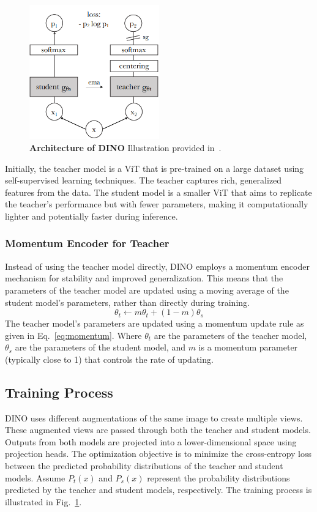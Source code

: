\begin{figure}
	\centering
	\includegraphics[width=0.5\textwidth]{Images/main/dino.png}
	\caption[\textbf{DINO Architecture }]{\textbf{Architecture of DINO} Illustration provided in~\cite{caron2021emerging}.}
	\label{fig:dino}
\end{figure} 
 
 Initially, the teacher model is a ViT that is pre-trained on a large dataset using self-supervised learning techniques. The teacher captures rich, generalized features from the data. The student model is a smaller ViT that aims to replicate the teacher's performance but with fewer parameters, making it computationally lighter and potentially faster during inference.
 
\subsubsection{Momentum Encoder for Teacher}
Instead of using the teacher model directly, DINO employs a momentum encoder mechanism for stability and improved generalization. This means that the parameters of the teacher model are updated using a moving average of the student model's parameters, rather than directly during training.
\begin{equation}
	\label{eq:momentum}
	\theta_t \leftarrow m \theta_t + (1 - m) \theta_s
\end{equation}
The teacher model's parameters are updated using a momentum update rule as given in Eq.~\ref{eq:momentum}. Where \(\theta_t\) are the parameters of the teacher model, \(\theta_s\) are the parameters of the student model, and \(m\) is a momentum parameter (typically close to 1) that controls the rate of updating.

\subsection{Training Process}
DINO uses different augmentations of the same image to create multiple views. These augmented views are passed through both the teacher and student models. Outputs from both models are projected into a lower-dimensional space using projection heads. The optimization objective is to minimize the cross-entropy loss between the predicted probability distributions of the teacher and student models. Assume \(P_t(x)\) and \(P_s(x)\) represent the probability distributions predicted by the teacher and student models, respectively. The training process is illustrated in Fig.~\ref{fig:dino}.

